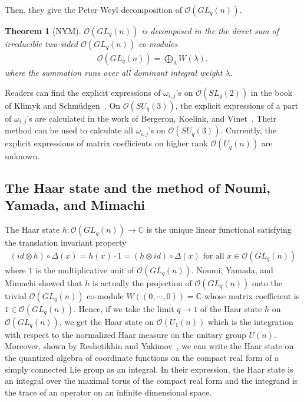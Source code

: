 \documentclass[table,a4paper,reqno]{amsart}
\numberwithin{equation}{section}
\newtheorem{theorem}{Theorem}[section]
\theoremstyle{definition}
\begin{document}
\noindent Then, they give the Peter-Weyl decomposition of $\mathcal{O}(GL_q(n))$.
\begin{theorem}[NYM]\label{thm:2.3}
    $\mathcal{O}(GL_q(n))$ is decomposed in the the direct sum of irreducible two-sided $\mathcal{O}(GL_q(n))$ co-modules
    \begin{align}
        \mathcal{O}(GL_q(n))=\bigoplus_\lambda W(\lambda),\label{eq:2.36}
    \end{align}
    where the summation runs over all dominant integral weight $\lambda$.
\end{theorem}
Readers can find the explicit expressions of $\omega_{i,j}$'s on $\mathcal{O}(SL_q(2))$ in the book of Klimyk and Schm{\"u}dgen~\cite{klimyk2012quantum}. On $\mathcal{O}(SU_q(3))$, the explicit expressions of a part of $\omega_{i,j}$'s are calculated in the work of Bergeron, Koelink, and Vinet~\cite{bergeron2019suq}. Their method can be used to calculate all $\omega_{i,j}$'s on $\mathcal{O}(SU_q(3))$. Currently, the explicit expressions of matrix coefficients on higher rank $\mathcal{O}(U_q(n))$ are unknown.

\subsection{The Haar state and the method of  Noumi, Yamada, and Mimachi}
The Haar state $h:\mathcal{O}(GL_q(n))\rightarrow \mathbb{C}$ is the unique linear functional satisfying the translation invariant property
\begin{align}
    (id\otimes h)\circ\Delta(x)=h(x)\cdot 1=(h\otimes id)\circ\Delta(x)\text{ for all }x\in \mathcal{O}(GL_q(n))
    \label{eq:2.37}
\end{align}
where $1$ is the multiplicative unit of $\mathcal{O}(GL_q(n))$. Noumi, Yamada, and Mimachi showed that $h$ is actually the projection of $\mathcal{O}(GL_q(n))$ onto the trivial $\mathcal{O}(GL_q(n))$ co-module $W((0,\cdots,0))=\mathbb{C}$ whose matrix coefficient is $1\in \mathcal{O}(GL_q(n))$. Hence, if we take the limit $q\rightarrow 1$ of the Haar state $h$ on $\mathcal{O}(GL_q(n))$, we get the Haar state on $\mathcal{O}(U_1(n))$ which is the integration with respect to the normalized Haar measure on the unitary group $U(n)$. Moreover, shown by Reshetikhin and Yakimov~\cite{reshetikhin2001quantum}, we can write the Haar state on the quantized algebra of coordinate functions on the compact real form of a simply connected Lie group as an integral. In their expression, the Haar state is an integral over the maximal torus of the compact real form and the integrand is the trace of an operator on an infinite dimensional space.
\end{document}
